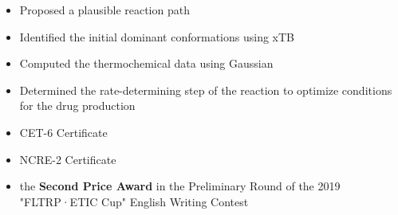 \documentclass[10pt,a4paper]{altacv}
\begin{document}
\begin{itemize}
\item Proposed a plausible reaction path
\item Identified the initial dominant conformations using xTB
\item Computed the thermochemical data using Gaussian
\item Determined the rate-determining step of the reaction to optimize conditions for the drug production
\end{itemize}



\begin{itemize}
\item CET-6 Certificate
\item NCRE-2 Certificate
\item the \textbf{Second Price Award} in the Preliminary Round of the 2019 "FLTRP·ETIC Cup" English Writing Contest
\end{itemize}







\clearpage
\end{document}

